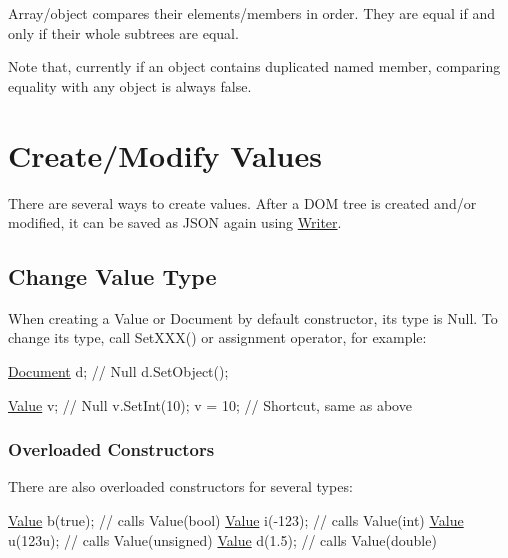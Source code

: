 Array/object compares their elements/members in order. They are equal if and only if their whole subtrees are equal.

Note that, currently if an object contains duplicated named member, comparing equality with any object is always {\ttfamily false}.\hypertarget{md_Commun_Externe_RapidJSON_doc_tutorial.zh-cn_CreateModifyValues}{}\section{Create/\+Modify Values}\label{md_Commun_Externe_RapidJSON_doc_tutorial.zh-cn_CreateModifyValues}
There are several ways to create values. After a D\+OM tree is created and/or modified, it can be saved as J\+S\+ON again using {\ttfamily \hyperlink{class_writer}{Writer}}.\hypertarget{md_Commun_Externe_RapidJSON_doc_tutorial.zh-cn_ChangeValueType}{}\subsection{Change Value Type}\label{md_Commun_Externe_RapidJSON_doc_tutorial.zh-cn_ChangeValueType}
When creating a Value or Document by default constructor, its type is Null. To change its type, call {\ttfamily Set\+X\+X\+X()} or assignment operator, for example\+:


\begin{DoxyCode}
\hyperlink{class_generic_document}{Document} d; \textcolor{comment}{// Null}
d.SetObject();

\hyperlink{class_generic_value}{Value} v;    \textcolor{comment}{// Null}
v.SetInt(10);
v = 10;     \textcolor{comment}{// Shortcut, same as above}
\end{DoxyCode}


\subsubsection*{Overloaded Constructors}

There are also overloaded constructors for several types\+:


\begin{DoxyCode}
\hyperlink{class_generic_value}{Value} b(\textcolor{keyword}{true});    \textcolor{comment}{// calls Value(bool)}
\hyperlink{class_generic_value}{Value} i(-123);    \textcolor{comment}{// calls Value(int)}
\hyperlink{class_generic_value}{Value} u(123u);    \textcolor{comment}{// calls Value(unsigned)}
\hyperlink{class_generic_value}{Value} d(1.5);     \textcolor{comment}{// calls Value(double)}
\end{DoxyCode}


